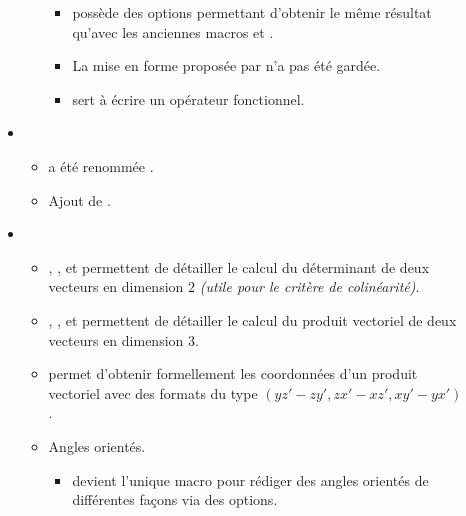 \documentclass[12pt,a4paper]{book}
\begin{document}
\begin{description}
\begin{itemize}[itemsep=.5em]
\begin{itemize}[itemsep=.5em]
\begin{itemize}[itemsep=.5em, label=$\rightarrow$]
            \item {} possède des options permettant d'obtenir le même résultat qu'avec les anciennes macros  et .

            \item La mise en forme proposée par  n'a pas été gardée.

            \item {} sert à écrire un opérateur fonctionnel.
	    \end{itemize}
    \end{itemize}




    \separation
    \item {}
    \begin{itemize}[itemsep=.5em]
        \item {} a été renommée .

        \item Ajout de .
    \end{itemize}




    \separation
    \item {}
    \begin{itemize}[itemsep=.5em]
        \item {}, ,  et  permettent de détailler le calcul du déterminant de deux vecteurs en dimension $2$ \emph{(utile pour le critère de colinéarité)}.


        \item {}, ,  et  permettent de détailler le calcul du produit vectoriel de deux vecteurs en dimension $3$.

        \item {} permet d'obtenir formellement les coordonnées d'un produit vectoriel avec des formats du type $(y z' - z y' , z x' - x z ' , x y' - y x')$.


        \item Angles orientés.
        
        \begin{itemize}[itemsep=.5em, label=$\rightarrow$]
            \item {} devient l'unique macro pour rédiger des angles orientés de différentes façons via des options.
            

\end{itemize}
\end{itemize}
\end{itemize}
\end{description}
\end{document}
